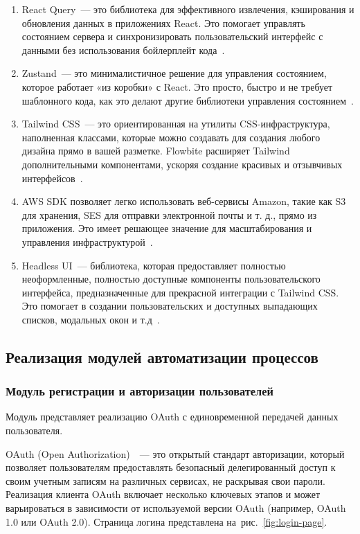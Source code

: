 \begin{enumerate}
	\item React Query~--- это библиотека для эффективного извлечения, кэширования и обновления данных в приложениях React. Это помогает управлять состоянием сервера и синхронизировать пользовательский интерфейс с данными без использования бойлерплейт кода~\cite{bib:reactquery}.
	
	\item Zustand~--- это минималистичное решение для управления состоянием, которое работает «из коробки» с React. Это просто, быстро и не требует шаблонного кода, как это делают другие библиотеки управления состоянием~\cite{bib:zustand}.
	
	\item Tailwind CSS~--- это ориентированная на утилиты CSS-инфраструктура, наполненная классами, которые можно создавать для создания любого дизайна прямо в вашей разметке. Flowbite расширяет Tailwind дополнительными компонентами, ускоряя создание красивых и отзывчивых интерфейсов~\cite{bib:tailwind}.
	
	\item AWS SDK позволяет легко использовать веб-сервисы Amazon, такие как S3 для хранения, SES для отправки электронной почты и т. д., прямо из приложения. Это имеет решающее значение для масштабирования и управления инфраструктурой~\cite{bib:awssdk}.
	
	\item Headless UI~--- библиотека, которая предоставляет полностью неоформленные, полностью доступные компоненты пользовательского интерфейса, предназначенные для прекрасной интеграции с Tailwind CSS. Это помогает в создании пользовательских и доступных выпадающих списков, модальных окон и т.д~\cite{bib:headlessui}.
\end{enumerate}

\subsection{Реализация модулей автоматизации процессов}

\subsubsection{Модуль регистрации и авторизации пользователей}

Модуль представляет реализацию OAuth с единовременной передачей данных пользователя.

OAuth (Open Authorization)~\cite{bib:oauth2}~--- это открытый стандарт авторизации, который позволяет пользователям предоставлять безопасный делегированный доступ к своим учетным записям на различных сервисах, не раскрывая свои пароли. Реализация клиента OAuth включает несколько ключевых этапов и может варьироваться в зависимости от используемой версии OAuth (например, OAuth 1.0 или OAuth 2.0). Страница логина представлена на~рис.~\ref{fig:login-page}.

